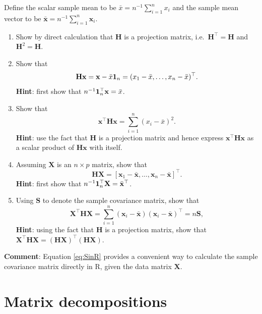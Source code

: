\documentclass[
]{book}
\theoremstyle{definition}
\theoremstyle{definition}
\theoremstyle{definition}
\theoremstyle{definition}
\theoremstyle{remark}
\begin{document}
\begin{enumerate}
  Define the scalar sample mean to be \(\bar{x}=n^{-1}\sum_{i=1}^n x_i\) and the sample mean vector to be \(\bar{\mathbf x}=n^{-1} \sum_{i=1}^n \mathbf x_i\).

  \begin{enumerate}
  \def\labelenumii{\roman{enumii}.}
  \item
    Show by direct calculation that \(\mathbf H\) is a projection matrix, i.e.~\(\mathbf H^\top = \mathbf H\) and \(\mathbf H^2 =\mathbf H\).
  \item
    Show that
    \[
      \mathbf H\mathbf x= \mathbf x- \bar{x}{\bf 1}_n = (  x_1 - \bar{x}, \ldots , x_n -\bar{x})^\top.
      \]
    \textbf{Hint}: first show that \(n^{-1}{\bf 1}_n^\top \mathbf x=\bar{x}\).
  \item
    Show that
    \[
      \mathbf x^\top \mathbf H\mathbf x= \sum_{i=1}^n (x_i-\bar{x})^2.
      \]
    \textbf{Hint}: use the fact that \(\mathbf H\) is a projection matrix and hence express \(\mathbf x^\top \mathbf H\mathbf x\) as a scalar product of \(\mathbf H\mathbf x\) with itself.
  \item
    Assuming \(\mathbf X\) is an \(n \times p\) matrix, show that
    \[
      \mathbf H\mathbf X=[\mathbf x_1 - \bar{\mathbf x}, \ldots , \mathbf x_n -\bar{\mathbf x}]^\top.
      \]
    \textbf{Hint}: first show that \(n^{-1} {\bf 1}_n^\top \mathbf X=\bar{\mathbf x}^\top\).
  \item
    Using \(\mathbf S\) to denote the sample covariance matrix, show that
    \begin{equation}
      \mathbf X^\top \mathbf H\mathbf X= \sum_{i=1}^n (\mathbf x_i -\bar{\mathbf x})(\mathbf x_i -\bar{\mathbf x})^\top = n\mathbf S,
       \label{eq:SinR}
      \end{equation}
    \textbf{Hint}: using the fact that \(\mathbf H\) is a projection matrix,
    show that
    \(\mathbf X^\top \mathbf H\mathbf X=(\mathbf H\mathbf X)^\top (\mathbf H\mathbf X)\).
  \end{enumerate}

  \textbf{Comment}: Equation \eqref{eq:SinR} provides a convenient way to calculate the sample covariance matrix directly in R, given the data matrix \(\mathbf X\).
\end{enumerate}

\chapter{Matrix decompositions}\label{linalg-decomp}
\end{document}
